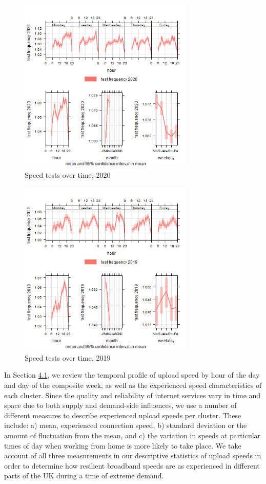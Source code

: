 \documentclass[Royal,times,sageh]{sagej}
\begin{document}
\begin{figure}
\centering
\includegraphics[width=0.75\textwidth,height=0.4\textheight]{figures/time.var.plot2020.png}
\caption{Speed tests over time, 2020 \label{test2020}}
\end{figure}

\begin{figure}
\centering
\includegraphics[width=0.75\textwidth,height=0.4\textheight]{figures/time.var.plot2019.png}
\caption{Speed tests over time, 2019 \label{test2019}}
\end{figure}

In Section \protect\hyperlink{sec:4.1}{4.1}, we review the temporal
profile of upload speed by hour of the day and day of the composite
week, as well as the experienced speed characteristics of each cluster.
Since the quality and reliability of internet services vary in time and
space due to both supply and demand-side influences, we use a number of
different measures to describe experienced upload speeds per cluster.
These include: a) mean, experienced connection speed, b) standard
deviation or the amount of fluctuation from the mean, and c) the
variation in speeds at particular times of day when working from home is
more likely to take place. We take account of all three measurements in
our descriptive statistics of upload speeds in order to determine how
resilient broadband speeds are as experienced in different parts of the
UK during a time of extreme demand.
\end{document}
